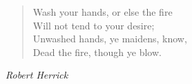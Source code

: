 
\begin{verse}
Wash your hands, or else the fire\\
Will not tend to your desire;\\
Unwashed hands, ye maidens, know,\\
Dead the fire, though ye blow.%
\end{verse}

\vspace{0.5\baselineskip}
\noindent\textit{Robert Herrick}
